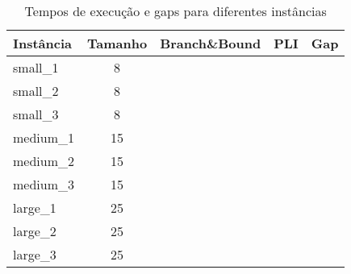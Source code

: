 \begin{table}[h]
\centering
\begin{tabular}{|l|c|c|c|c|}
\hline
\textbf{Instância} & \textbf{Tamanho} & \textbf{Branch\&Bound} & \textbf{PLI} & \textbf{Gap} \\
\hline
small\_1 & 8 & & & \\
small\_2 & 8 & & & \\
small\_3 & 8 & & & \\
\hline
medium\_1 & 15 & & & \\
medium\_2 & 15 & & & \\
medium\_3 & 15 & & & \\
\hline
large\_1 & 25 & & & \\
large\_2 & 25 & & & \\
large\_3 & 25 & & & \\
\hline
\end{tabular}
\caption{Tempos de execução e gaps para diferentes instâncias}
\label{tab:times}
\end{table}